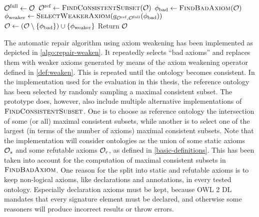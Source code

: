 \begin{algorithm}[ht]
  \begin{algorithmic}
    \State ${\mathcal{O}^\textnormal{full}} \gets \mathcal{O}$
    \State ${\mathcal{O}^\textnormal{ref}} \gets \textsc{FindConsistentSubset}(\mathcal{O})$
      \State $\phi_\textnormal{bad} \gets \textsc{FindBadAxiom}(\mathcal{O})$
      \State $\phi_\textnormal{weaker} \gets \textsc{SelectWeakerAxiom}(g_{{\mathcal{O}^\textnormal{ref}},{\mathcal{O}^\textnormal{full}}}(\phi_\textnormal{bad}))$
      \State $\mathcal{O} \gets (\mathcal{O} \setminus \{\phi_\textnormal{bad}\}) \cup \{\phi_\textnormal{weaker}\}$
    \EndWhile
    \State Return $\mathcal{O}$
  \end{algorithmic}
  \caption{$\textsc{RepairOntologyWeaken}(\Omc)$}
  \label{algo:repair-weaken}
\end{algorithm}

The automatic repair algorithm using axiom weakening has been implemented as depicted in \cref{algo:repair-weaken}. It repeatedly selects ``bad axioms'' and replaces them with weaker axioms generated by means of the axiom weakening operator defined in \cref{def:weaken}. This is repeated until the ontology becomes consistent. In the implementation used for the evaluation in this thesis, the reference ontology has been selected by randomly sampling a maximal consistent subset. The prototype does, however, also include multiple alternative implementations of $\textsc{FindConsistentSubset}$. One is to choose as reference ontology the intersection of some (or all) maximal consistent subsets, while another is to select one of the largest (in terms of the number of axioms) maximal consistent subsets. Note that the implementation will consider ontologies as the union of some static axioms $\mathcal{O}_s$ and some refutable axioms $\mathcal{O}_r$, as defined in \cref{basic-definitions}. This has been taken into account for the computation of maximal consistent subsets in $\textsc{FindBadAxiom}$. One reason for the split into static and refutable axioms is to keep non-logical axioms, like declarations and annotations, in every tested ontology. Especially declaration axioms must be kept, because OWL 2 DL mandates that every signature element must be declared, and otherwise some reasoners will produce incorrect results or throw errors.


